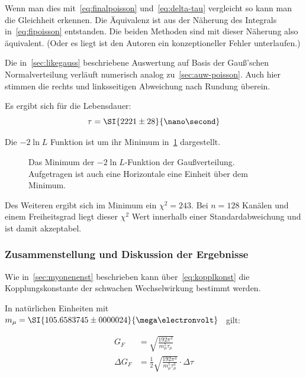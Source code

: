 \documentclass[slug=LM, room=Andreas-Schubert-Bau\,\ K\ 1A, supervisor=Anne-Sophie\ Berthold, coursedate=13.\ 12.\ 2019]{../../Lab_Report_LaTeX/lab_report}
\begin{document}
Wenn man dies mit~\ref{eq:finalpoisson} und~\ref{eq:delta-tau}
vergleicht so kann man die Gleichheit erkennen. Die Äquivalenz ist
aus der N\"aherung des Integrals in~\ref{eq:fipoisson}
entstanden. Die beiden Methoden sind mit dieser N\"aherung also
\"aquivalent. (Oder es liegt ist den Autoren ein konzeptioneller
Fehler unterlaufen.)

Die in~\ref{sec:likegauss} beschriebene Auswertung auf Basis der
Gauß'schen Normalverteilung verl\"auft numerisch analog
zu~\ref{sec:auw-poisson}. Auch hier stimmen die rechts und
linksseitigen Abweichung nach Rundung \"uberein.

Es ergibt sich f\"ur die Lebensdauer:
\begin{equation}
  \label{eq:result-poisson}
  \tau = \SI{2221\pm 28}{\nano\second}
\end{equation}

Die \(-2\ln{L}\) Funktion ist um ihr Minimum
in~\ref{fig:haupt-poisson} dargestellt.

\begin{figure}[h]\centering
  
  \caption{Das Minimum der \(-2\ln{L}\)-Funktion der
    Gaußverteilung. Aufgetragen ist auch eine Horizontale eine
    Einheit \"uber dem Minimum.}
  \label{fig:haupt-poisson}
\end{figure}

Des Weiteren ergibt sich im Minimum ein \(\chi^2=243\). Bei \(n=128\)
Kan\"alen und einem Freiheitsgrad liegt dieser \(\chi^2\) Wert
innerhalb einer Standardabweichung und ist damit akzeptabel.


\subsubsection{Zusammenstellung und Diskussion der Ergebnisse}
\label{sec:disk}

Wie in~\ref{sec:myonenenst} beschrieben kann
\"uber~\ref{eq:kopplkonst} die Kopplungskonstante der schwachen
Wechselwirkung bestimmt werden.

In nat\"urlichen Einheiten mit
\(m_\mu = \SI{105.6583745\pm
  0000024}{\mega\electronvolt}\)~\cite{codata} gilt:

\begin{align}
  \label{eq:couplingconstant}
  G_F &= \sqrt{\frac{192\pi^3}{m_\mu^5\tau_\mu}} \\
  \Delta G_F &=
  \frac{1}{2}\sqrt{\frac{192\pi^3}{m_\mu^5\tau_\mu^3}}\cdot \Delta \tau
\end{align}
\end{document}
